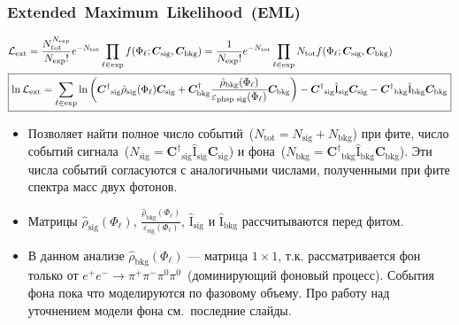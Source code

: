 \documentclass{beamer}
\begin{document}
\begin{frame}
  \frametitle{Extended~Maximum~Likelihood~(EML)}
  \scriptsize
  \begin{eqnarray*}
    \textstyle
    \begin{split}
      &\mathcal{L}_{\text{ext}} = \frac{N^{N_{\text{exp}}}_{\text{tot}}}{N_{\text{exp}}!}e^{-N_{\text{tot}}}\prod_{\ell \in \text{exp}}f(\Phi_{\ell};\bm{C}_{\text{sig}},\bm{C}_{\text{bkg}}) = \frac{1}{N_{\text{exp}}!}e^{-N_{\text{tot}}}\prod_{\ell \in \text{exp}}N_{\text{tot}}f(\Phi_{\ell};\bm{C}_{\text{sig}},\bm{C}_{\text{bkg}}) \\
      &\boxed{%
       \ln{\mathcal{L}_{\text{ext}}} = \sum_{\ell \in \text{exp}}\ln{\left(
        {\bm{C}^{\dag}}_{\text{sig}}\hat{\rho}_{\text{sig}}(\Phi_{\ell})\bm{C}_{\text{sig}} +
        \bm{C}^{\dag}_{\text{bkg}}\frac{\hat{\rho}_{\text{bkg}}(\Phi_{\ell})}{\varepsilon_{\text{phsp sig}}(\Phi_{\ell})}\bm{C}_{\text{bkg}} \right)} - {\bm{C}^{\dag}}_{\text{sig}}\hat{\text{I}}_{\text{sig}}\bm{C}_{\text{sig}} - {\bm{C}^{\dag}}_{\text{bkg}}\hat{\text{I}}_{\text{bkg}}\bm{C}_{\text{bkg}}%
        }
    \end{split}
  \end{eqnarray*}
  \begin{itemize}
    \item Позволяет найти полное число событий~($N_{\text{tot}}=N_{\text{sig}} + N_{\text{bkg}}$) при фите, число
      событий
      сигнала~($N_{\text{sig}}={\bm{C}^{\dag}}_{\text{sig}}\hat{\text{I}}_{\text{sig}}\bm{C}_{\text{sig}}$)
      и
      фона~($N_{\text{bkg}}={\bm{C}^{\dag}}_{\text{bkg}}\hat{\text{I}}_{\text{bkg}}\bm{C}_{\text{bkg}}$).
      Эти числа событий согласуются с аналогичными числами, полученными при фите
      спектра масс двух фотонов.
    \item Матрицы $\hat{\rho}_{\text{sig}}(\Phi_{\ell})$,
      $\frac{\hat{\rho}_{\text{bkg}}(\Phi_{\ell})}{\varepsilon_{\text{sig}}(\Phi_{\ell})}$,
      $\hat{\text{I}}_{\text{sig}}$ и $\hat{\text{I}}_{\text{bkg}}$ рассчитываются
      перед фитом.
    \item В данном анализе $\hat{\rho}_{\text{bkg}}(\Phi_{\ell})$ --- матрица $1\times{1}$, т.к.
      рассматривается фон только от $e^+e^-\rightarrow\pi^+\pi^-\pi^0\pi^0$~(доминирующий фоновый
      процесс). События фона пока что моделируются по фазовому объему. Про работу над уточнением модели фона см.\ последние слайды.
    \end{itemize}
  \end{frame}
\end{document}
